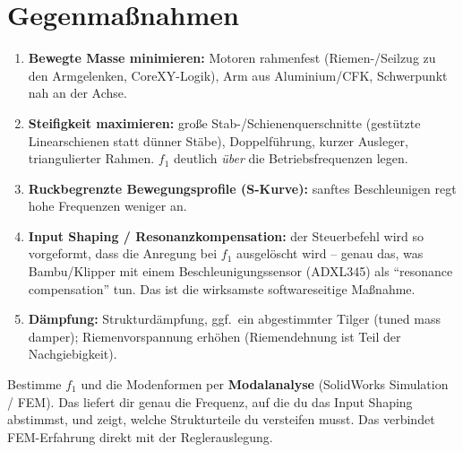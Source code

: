 \section{Gegenmaßnahmen}
\begin{enumerate}
\item \textbf{Bewegte Masse minimieren:} Motoren rahmenfest (Riemen-/Seilzug
  zu den Armgelenken, CoreXY-Logik), Arm aus Aluminium/CFK, Schwerpunkt nah an
  der Achse.
\item \textbf{Steifigkeit maximieren:} große Stab-/Schienenquerschnitte
  (gestützte Linearschienen statt dünner Stäbe), Doppelführung, kurzer
  Ausleger, triangulierter Rahmen. $f_1$ deutlich \emph{über} die
  Betriebsfrequenzen legen.
\item \textbf{Ruckbegrenzte Bewegungsprofile (S-Kurve):} sanftes Beschleunigen
  regt hohe Frequenzen weniger an.
\item \textbf{Input Shaping / Resonanzkompensation:} der Steuerbefehl wird so
  vorgeformt, dass die Anregung bei $f_1$ ausgelöscht wird -- genau das, was
  Bambu/Klipper mit einem Beschleunigungssensor (ADXL345) als ``resonance
  compensation'' tun. Das ist die wirksamste softwareseitige Maßnahme.
\item \textbf{Dämpfung:} Strukturdämpfung, ggf.\ ein abgestimmter Tilger
  (tuned mass damper); Riemenvorspannung erhöhen (Riemendehnung ist Teil der
  Nachgiebigkeit).
\end{enumerate}

\begin{infobox}[title=Anknüpfung an den FEM-Hintergrund]
Bestimme $f_1$ und die Modenformen per \textbf{Modalanalyse} (SolidWorks
Simulation / FEM). Das liefert dir genau die Frequenz, auf die du das Input
Shaping abstimmst, und zeigt, welche Strukturteile du versteifen musst. Das
verbindet FEM-Erfahrung direkt mit der Reglerauslegung.
\end{infobox}
